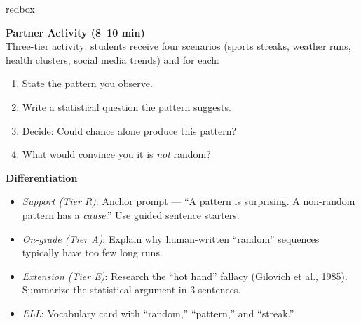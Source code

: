 \documentclass[10pt]{article}
\begin{document}
\begin{skillbox}{redbox}
\begin{minipage}[t]{0.48\linewidth}
    \textbf{Partner Activity (8--10 min)}\\
    Three-tier activity: students receive four scenarios (sports streaks, weather runs,
    health clusters, social media trends) and for each:
    \begin{enumerate}
        \item State the pattern you observe.
        \item Write a statistical question the pattern suggests.
        \item Decide: Could chance alone produce this pattern?
        \item What would convince you it is \emph{not} random?
    \end{enumerate}
\end{minipage}
\hfill
\begin{minipage}[t]{0.48\linewidth}
    \textbf{Differentiation}
    \begin{itemize}
        \item \textit{Support (Tier R)}: Anchor prompt --- ``A pattern is surprising.
              A non-random pattern has a \emph{cause}.'' Use guided sentence starters.
        \item \textit{On-grade (Tier A)}: Explain why human-written ``random'' sequences
              typically have too few long runs.
        \item \textit{Extension (Tier E)}: Research the ``hot hand'' fallacy (Gilovich
              et al., 1985). Summarize the statistical argument in 3 sentences.
        \item \textit{ELL}: Vocabulary card with ``random,'' ``pattern,'' and ``streak.''
    \end{itemize}
\end{minipage}
\end{skillbox}
\end{document}
